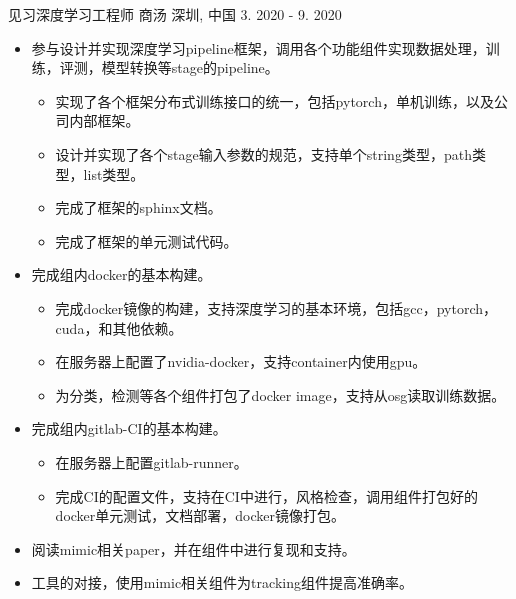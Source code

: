 

\begin{cventries}

  \cventry
    {见习深度学习工程师} %
    {商汤} %
    {深圳, 中国} %
    {3. 2020 - 9. 2020} %
    {
      \begin{itemize} %
        \item {参与设计并实现深度学习pipeline框架，调用各个功能组件实现数据处理，训练，评测，模型转换等stage的pipeline。}
          \begin{itemize}
            \item {实现了各个框架分布式训练接口的统一，包括pytorch，单机训练，以及公司内部框架。}
            \item {设计并实现了各个stage输入参数的规范，支持单个string类型，path类型，list类型。}
            \item {完成了框架的sphinx文档。}
            \item {完成了框架的单元测试代码。}
          \end{itemize}
        \item {完成组内docker的基本构建。}
          \begin{itemize}
            \item {完成docker镜像的构建，支持深度学习的基本环境，包括gcc，pytorch，cuda，和其他依赖。}
            \item {在服务器上配置了nvidia-docker，支持container内使用gpu。}
            \item {为分类，检测等各个组件打包了docker image，支持从osg读取训练数据。}
          \end{itemize}
        \item {完成组内gitlab-CI的基本构建。}
          \begin{itemize}
            \item {在服务器上配置gitlab-runner。}
            \item {完成CI的配置文件，支持在CI中进行，风格检查，调用组件打包好的docker单元测试，文档部署，docker镜像打包。}
          \end{itemize}
        \item {阅读mimic相关paper，并在组件中进行复现和支持。}
        \item {工具的对接，使用mimic相关组件为tracking组件提高准确率。}
      \end{itemize}
    }
  

\end{cventries}
